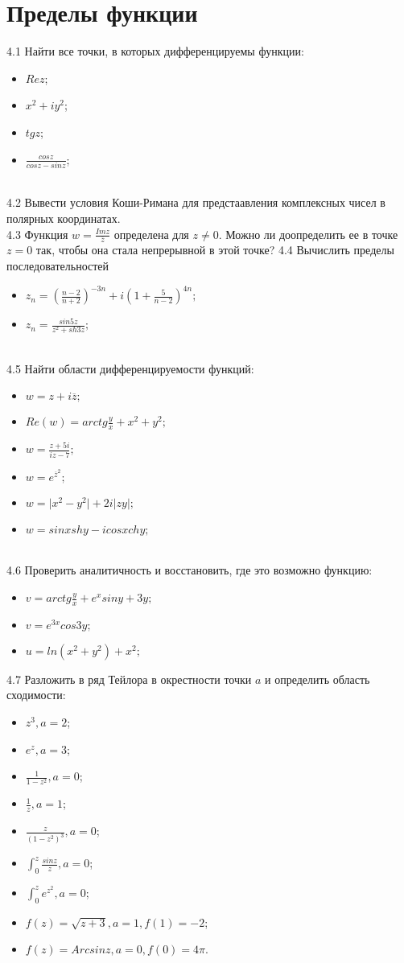 \documentclass{article}
\begin{document}
\section{Пределы функции}
4.1 Найти все точки, в которых дифференцируемы функции:\begin{itemize}
\item $Re z$;
\item $x^2+iy^2$;
\item $tg z$;
\item $\frac{cos z}{cos z - sin z}$;
\end{itemize}\\
4.2 Вывести условия Коши-Римана для предстаавления комплексных чисел в  полярных координатах. \\
4.3 Функция $w = \frac{Im z}{\overline{z}}$ определена для $z \neq 0$. Можно ли доопределить ее в точке $z = 0$ так, чтобы она стала непрерывной в этой точке? %
4.4 Вычислить пределы последовательностей
\begin{itemize}
\item $z_n = (\frac{n-2}{n+2})^{-3n} + i(1+\frac{5}{n-2})^{4n};$
\item $z_n=\frac{sin{5z}}{z^2+sh{3z}};$
\end{itemize}
\\
4.5 Найти области дифференцируемости функций:
\begin{itemize}
\item $w=z+i\overline{z};$
\item $Re(w) = arctg \frac{y}{x} + x^2 + y^2;$
\item $w=\frac{z+5i}{iz-7};$
\item $w=e^\overline{z}^2;$
\item $w=\vert x^2 - y^2 \vert +2i\vert zy \vert;$
\item $w=sin{x}sh{y} -i cos{x}ch{y};$
\end{itemize}\\
4.6 Проверить аналитичность и восстановить, где это возможно функцию:
\begin{itemize}
\item $v = arctg \frac{y}{x} +e^xsin{y}+3y;$
\item $v=e^{3x}cos{3y};$
\item $u=ln(x^2+y^2)+x^2;$
\end{itemize}
4.7 Разложить в ряд Тейлора в окрестности точки $a$ и определить область сходимости:
\begin{itemize}
\item $z^3, a=2$;
\item $e^z, a=3$;
\item $\frac{1}{1-z^2}, a=0$;
\item $\frac{1}{z}, a=1$;
\item $\frac{z}{(1-z^2)^3}, a=0$;
\item $\int_0^z \frac{sin z}{z},a=0$;
\item $\int_0^z e^z^2,a=0$;
\item $f(z)=\sqrt{z+3}, a=1,f(1)=-2$;
\item $f(z)=Arcsinz,a=0, f(0)=4\pi$.
\end{itemize}\\
\end{document}
